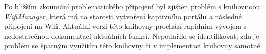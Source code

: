 Po bližším zkoumání problematického připojení byl zjišten problém s knihovnoou \textit{WifiManager}, která má na starosti vytvoření kaptivního portálu a následné připojení na Wifi. Aktuální verzi této knihovny prochází rapidním vývojem s nedostatečnou dokumentací aktuálních funkcí. Nepodařilo se identifikovat, zda je problém se špatným využitím této knihovny či v implementaci knihovny samotné.